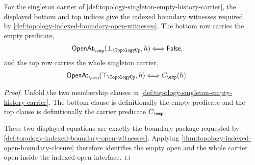 \begin{theorem}
\label{thm:topology-singleton-boundary-open-laws}
For the singleton carrier of \autoref{def:topology-singleton-empty-history-carrier}, the displayed bottom and top indices give the indexed boundary witnesses required by \autoref{def:topology-indexed-boundary-open-witnesses}. The bottom row carries the empty predicate,
$$
\mathsf{OpenAt}_{\emp}(\bot_{\TopologyUp},h)\Longleftrightarrow\mathsf{False},
$$
and the top row carries the whole singleton carrier,
$$
\mathsf{OpenAt}_{\emp}(\top_{\TopologyUp},h)\Longleftrightarrow C_{\emp}(h).
$$
\end{theorem}
\begin{proof}
Unfold the two membership clauses in \autoref{def:topology-singleton-empty-history-carrier}. The bottom clause is definitionally the empty predicate and the top clause is definitionally the carrier predicate $C_{\emp}$.

These two displayed equations are exactly the boundary package requested by \autoref{def:topology-indexed-boundary-open-witnesses}. Applying \autoref{thm:topology-indexed-open-boundary-closure} therefore identifies the empty open and the whole carrier open inside the indexed-open interface.
\end{proof}


